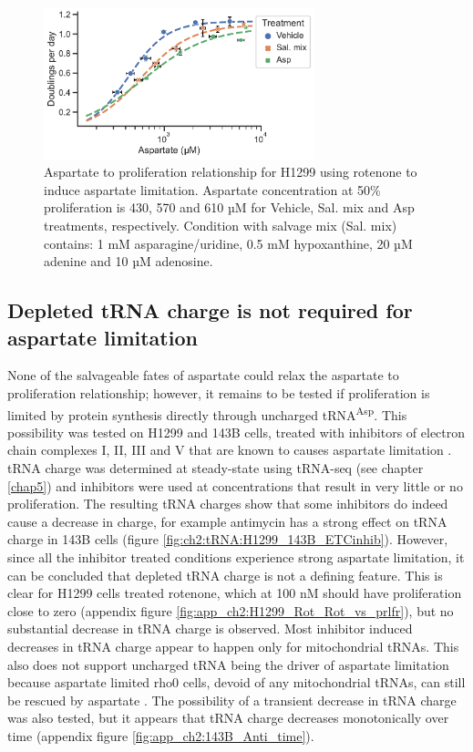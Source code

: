 \begin{figure}
    \centering
    \includegraphics[width=0.7\textwidth]{figures/chap2/H1299_Rot_Asp_vs_prlfr_noPyr.pdf}
    \caption[H1299 rotenone titration aspartate to proliferation.]{
    Aspartate to proliferation relationship for H1299 using rotenone to induce aspartate limitation.
    Aspartate concentration at 50\% proliferation is 430, 570 and 610 µM for Vehicle, Sal. mix and Asp treatments, respectively.
    Condition with salvage mix (Sal. mix) contains: 1 mM asparagine/uridine, 0.5 mM hypoxanthine, 20 µM adenine and 10 µM adenosine.
    }
    \label{fig:ch2:H1299_Rot_Asp_vs_prlfr}
\end{figure}




\subsection{Depleted tRNA charge is not required for aspartate limitation}
None of the salvageable fates of aspartate could relax the aspartate to proliferation relationship; however, it remains to be tested if proliferation is limited by protein synthesis directly through uncharged tRNA\textsuperscript{Asp}.
This possibility was tested on H1299 and 143B cells, treated with inhibitors of electron chain complexes I, II, III and V that are known to causes aspartate limitation \cite{Sullivan2015-xf, Hart2023-gp}.
tRNA charge was determined at steady-state using tRNA-seq (see chapter \ref{chap5}) and inhibitors were used at concentrations that result in very little or no proliferation.
The resulting tRNA charges show that some inhibitors do indeed cause a decrease in charge, for example antimycin has a strong effect on tRNA charge in 143B cells (figure \ref{fig:ch2:tRNA:H1299_143B_ETCinhib}).
However, since all the inhibitor treated conditions experience strong aspartate limitation, it can be concluded that depleted tRNA charge is not a defining feature.
This is clear for H1299 cells treated rotenone, which at 100 nM should have proliferation close to zero (appendix figure \ref{fig:app_ch2:H1299_Rot_Rot_vs_prlfr}), but no substantial decrease in tRNA charge is observed.
Most inhibitor induced decreases in tRNA charge appear to happen only for mitochondrial tRNAs.
This also does not support uncharged tRNA being the driver of aspartate limitation because aspartate limited rho0 cells, devoid of any mitochondrial tRNAs, can still be rescued by aspartate \cite{Birsoy2015-pg}.
The possibility of a transient decrease in tRNA charge was also tested, but it appears that tRNA charge decreases monotonically over time (appendix figure \ref{fig:app_ch2:143B_Anti_time}).

